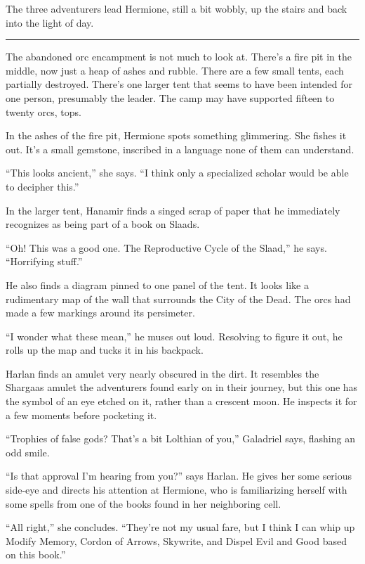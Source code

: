 \documentclass[smalldemyvopaper,11pt,twoside,onecolumn,openright,extrafontsizes]{memoir}
\begin{document}
The three adventurers lead Hermione, still a bit wobbly, up the stairs
and back into the light of day.

\begin{center}\rule{0.5\linewidth}{\linethickness}\end{center}

The abandoned orc encampment is not much to look at. There's a fire pit
in the middle, now just a heap of ashes and rubble. There are a few
small tents, each partially destroyed. There's one larger tent that
seems to have been intended for one person, presumably the leader. The
camp may have supported fifteen to twenty orcs, tops.

In the ashes of the fire pit, Hermione spots something glimmering. She
fishes it out. It's a small gemstone, inscribed in a language none of
them can understand.

``This looks ancient,'' she says. ``I think only a specialized scholar
would be able to decipher this.''

In the larger tent, Hanamir finds a singed scrap of paper that he
immediately recognizes as being part of a book on Slaads.

``Oh! This was a good one. The Reproductive Cycle of the Slaad,'' he
says. ``Horrifying stuff.''

He also finds a diagram pinned to one panel of the tent. It looks like a
rudimentary map of the wall that surrounds the City of the Dead. The
orcs had made a few markings around its persimeter.

``I wonder what these mean,'' he muses out loud. Resolving to figure it
out, he rolls up the map and tucks it in his backpack.

Harlan finds an amulet very nearly obscured in the dirt. It resembles
the Shargaas amulet the adventurers found early on in their journey, but
this one has the symbol of an eye etched on it, rather than a crescent
moon. He inspects it for a few moments before pocketing it.

``Trophies of false gods? That's a bit Lolthian of you,'' Galadriel
says, flashing an odd smile.

``Is that approval I'm hearing from you?'' says Harlan. He gives her
some serious side-eye and directs his attention at Hermione, who is
familiarizing herself with some spells from one of the books found in
her neighboring cell.

``All right,'' she concludes. ``They're not my usual fare, but I think I
can whip up Modify Memory, Cordon of Arrows, Skywrite, and Dispel Evil
and Good based on this book.''
\end{document}
